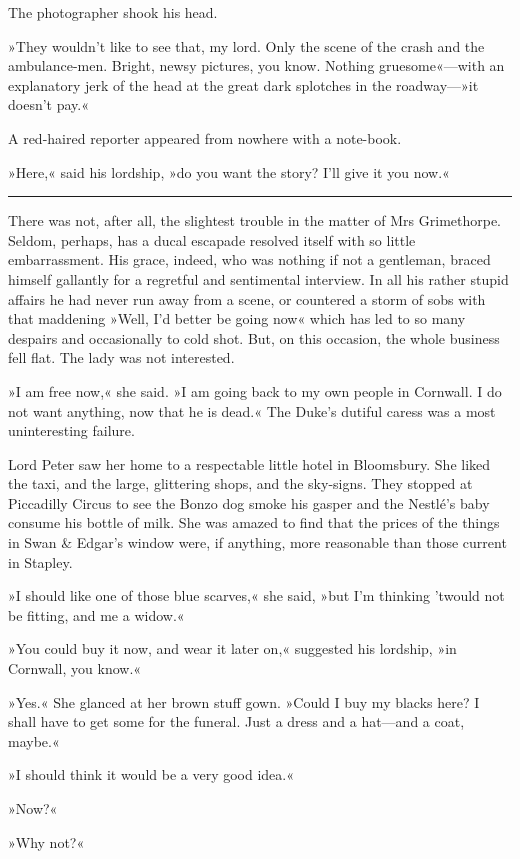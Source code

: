 The photographer shook his head.

»They wouldn't like to see that, my lord. Only the scene of the crash and the ambulance-men. Bright, newsy pictures, you know. Nothing gruesome«—with an explanatory jerk of the head at the great dark splotches in the roadway—»it doesn't pay.«

A red-haired reporter appeared from nowhere with a note-book.

»Here,« said his lordship, »do you want the story? I'll give it you now.« 

\noindent\hfil\rule{0.5\textwidth}{.4pt}\hfil 

There was not, after all, the slightest trouble in the matter of Mrs  Grimethorpe. Seldom, perhaps, has a ducal escapade resolved itself with so little embarrassment. His grace, indeed, who was nothing if not a gentleman, braced himself gallantly for a regretful and sentimental interview. In all his rather stupid affairs he had never run away from a scene, or countered a storm of sobs with that maddening »Well, I'd better be going now« which has led to so many despairs and occasionally to cold shot. But, on this occasion, the whole business fell flat. The lady was not interested.

»I am free now,« she said. »I am going back to my own people in Cornwall. I do not want anything, now that he is dead.« The Duke's dutiful caress was a most uninteresting failure.

Lord Peter saw her home to a respectable little hotel in Bloomsbury.  She liked the taxi, and the large, glittering shops, and the sky-signs.  They stopped at Piccadilly Circus to see the Bonzo dog smoke his gasper and the Nestlé's baby consume his bottle of milk. She was amazed to find that the prices of the things in Swan \& Edgar's window were, if anything, more reasonable than those current in Stapley.

»I should like one of those blue scarves,« she said, »but I'm thinking 'twould not be fitting, and me a widow.«

»You could buy it now, and wear it later on,« suggested his lordship, »in Cornwall, you know.«

»Yes.« She glanced at her brown stuff gown. »Could I buy my blacks here? I shall have to get some for the funeral. Just a dress and a hat—and a coat, maybe.«

»I should think it would be a very good idea.«

»Now?«

»Why not?«

